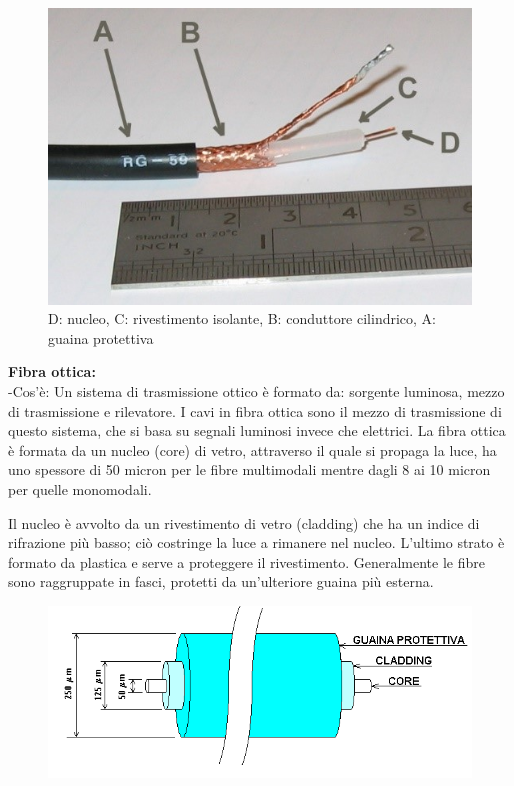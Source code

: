 \begin{figure}[H]
\centering
\includegraphics[scale=1]{res/img/3_cavoCoassiale.jpg}
\caption{D: nucleo, C: rivestimento isolante, B: conduttore cilindrico, A: guaina protettiva}
\end{figure}

\textbf{Fibra ottica:}\\
-Cos’è: Un sistema di trasmissione ottico è formato da: sorgente luminosa, mezzo di trasmissione e rilevatore. I cavi in fibra ottica sono il mezzo di trasmissione di questo sistema, che si basa su segnali luminosi invece che elettrici.
La fibra ottica è formata da un nucleo (core) di vetro, attraverso il quale si propaga la luce, ha uno spessore di 50 micron per le fibre multimodali mentre dagli 8 ai 10 micron per quelle monomodali.

Il nucleo è avvolto da un rivestimento di vetro (cladding) che ha un indice di rifrazione più basso; ciò costringe la luce a rimanere nel nucleo. L’ultimo strato è formato da plastica e serve a proteggere il rivestimento. Generalmente le fibre sono raggruppate in fasci, protetti da un’ulteriore guaina più esterna.  

\begin{figure}[H]
\centering
\includegraphics[scale=0.7]{res/img/3_FibraOttica.png}
\end{figure}

